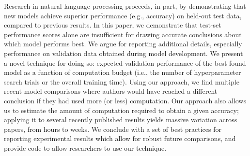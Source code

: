 Research in natural language processing proceeds, in part, by demonstrating that new models achieve superior performance (e.g., accuracy) on held-out test data,  compared to previous  results. In this paper, we demonstrate that test-set performance scores alone are insufficient for  drawing accurate conclusions about which model performs best. We argue for reporting additional details, especially performance  on  validation  data  obtained  during model development.  We present a novel technique  for  doing  so: expected  validation  performance of the best-found model as a function of computation budget (i.e., the  number of hyperparameter search trials or the overall training  time). Using our approach, we find multiple recent model comparisons where authors would have reached a different conclusion if they had  used more (or less) computation. Our approach also allows us to estimate  the  amount  of  computation required to obtain a given accuracy; applying it to several recently published results yields massive variation across papers, from hours to weeks. We conclude with a set of best  practices for reporting experimental results which allow for robust future comparisons, and provide code to allow researchers to use our technique.